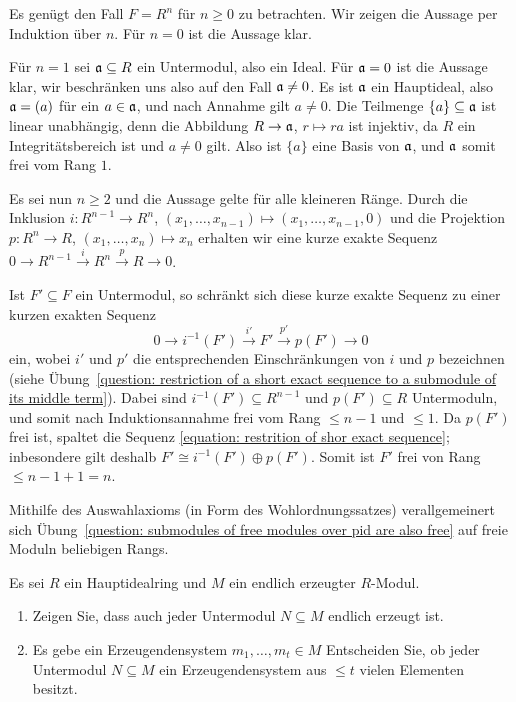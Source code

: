 \begin{solution}
  Es genügt den Fall $F = R^n$ für $n \geq 0$ zu betrachten.
  Wir zeigen die Aussage per Induktion über $n$.
  Für $n = 0$ ist die Aussage klar.
  
  Für $n = 1$ sei $\mathfrak{a} \subseteq R$ ein Untermodul, also ein Ideal.
  Für $\mathfrak{a} = 0$ ist die Aussage klar, wir beschränken uns also auf den Fall $\mathfrak{a} \neq 0$.
  Es ist $\mathfrak{a}$ ein Hauptideal, also $\mathfrak{a} = (a)$ für ein $a \in \mathfrak{a}$, und nach Annahme gilt $a \neq 0$.
  Die Teilmenge $\{a\} \subseteq \mathfrak{a}$ ist linear unabhängig, denn die Abbildung $R \to \mathfrak{a}$, $r \mapsto ra$ ist injektiv, da $R$ ein Integritätsbereich ist und $a \neq 0$ gilt.
  Also ist $\{a\}$ eine Basis von $\mathfrak{a}$, und $\mathfrak{a}$ somit frei vom Rang $1$.
  
  Es sei nun $n \geq 2$ und die Aussage gelte für alle kleineren Ränge.
  Durch die Inklusion $i \colon R^{n-1} \to R^n$, $(x_1, \dotsc, x_{n-1}) \mapsto (x_1, \dotsc, x_{n-1}, 0)$ und die Projektion $p \colon R^n \to R$, $(x_1, \dotsc, x_n) \mapsto x_n$ erhalten wir eine kurze exakte Sequenz $0 \to R^{n-1} \xrightarrow{i} R^n \xrightarrow{p} R \to 0$.
  
  Ist $F' \subseteq F$ ein Untermodul, so schränkt sich diese kurze exakte Sequenz zu einer kurzen exakten Sequenz
  \begin{equation}
    \label{equation: restrition of shor exact sequence}
    0 \to i^{-1}(F') \xrightarrow{i'} F' \xrightarrow{p'} p(F') \to 0
  \end{equation}
  ein, wobei $i'$ und $p'$ die entsprechenden Einschränkungen von $i$ und $p$ bezeichnen (siehe Übung~\ref{question: restriction of a short exact sequence to a submodule of its middle term}).
  Dabei sind $i^{-1}(F') \subseteq R^{n-1}$ und $p(F') \subseteq R$ Untermoduln, und somit nach Induktionsannahme frei vom Rang $\leq n-1$ und $\leq 1$.
  Da $p(F')$ frei ist, spaltet die Sequenz \eqref{equation: restrition of shor exact sequence};
  inbesondere gilt deshalb $F' \cong i^{-1}(F') \oplus p(F')$.
  Somit ist $F'$ frei von Rang $\leq n-1 + 1 = n$.
\end{solution}


\begin{remark*}
  Mithilfe des Auswahlaxioms (in Form des Wohlordnungssatzes) verallgemeinert sich Übung~\ref{question: submodules of free modules over pid are also free} auf freie Moduln beliebigen Rangs.
\end{remark*}


\begin{question}[subtitle = Untermoduln endlich erzeugter Moduln über Hauptidealringen]
  Es sei $R$ ein Hauptidealring und $M$ ein endlich erzeugter $R$-Modul.
  \begin{enumerate}
    \item
      Zeigen Sie, dass auch jeder Untermodul $N \subseteq M$ endlich erzeugt ist.
    \item
      Es gebe ein Erzeugendensystem $m_1, \dotsc, m_t \in M$
      Entscheiden Sie, ob jeder Untermodul $N \subseteq M$ ein Erzeugendensystem aus $\leq t$ vielen Elementen besitzt.
  \end{enumerate}
\end{question}


